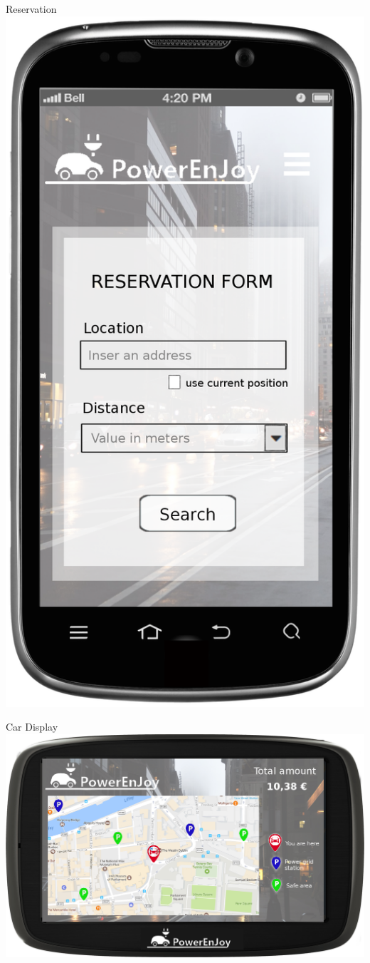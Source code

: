 \documentclass{beamer}
\begin{document}
\begin{frame}{Reservation}
    \includegraphics[height=0.8\textheight]{reservation.png}
\end{frame}

\begin{frame}{Car Display}
    \includegraphics[width=\textwidth]{screen.png}
\end{frame}
\end{document}
